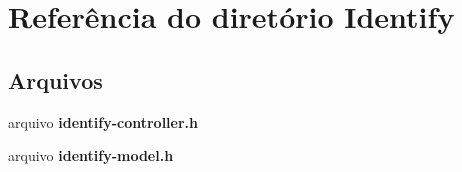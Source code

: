 \section{Referência do diretório Identify}
\label{dir_379374c3908478927c0586646813799f}
\subsection*{Arquivos}
\begin{DoxyCompactItemize}
\item 
arquivo {\bf identify-\/controller.\+h}
\item 
arquivo {\bf identify-\/model.\+h}
\end{DoxyCompactItemize}
